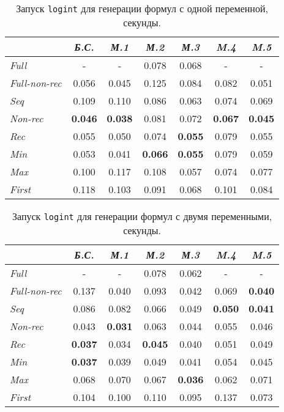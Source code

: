 \begin{table}[h!]
\center
\begin{tabular}{|l|c|c|c|c|c|c|}
\hline
   &{\it Б.С.}&{\it М.1}&{\it М.2}&{\it М.3}&{\it M.4}&{\it M.5} \\ \hline
{\it Full        }&    -         &     -        & 0.078       & 0.068       &    -        &  -  \\ \hline
{\it Full-non-rec}& 0.056        &  0.045       & 0.125       & 0.084       & 0.082       & 0.051\\ \hline
{\it Seq         }& 0.109        &  0.110       & 0.086       & 0.063       & 0.074       & 0.069 \\ \hline
{\it Non-rec     }& {\bf 0.046}  &  {\bf 0.038} & 0.081       & 0.072       & {\bf 0.067} & {\bf 0.045} \\ \hline
{\it Rec         }& 0.055        &  0.050       & 0.074       & {\bf 0.055} & 0.079       & 0.055\\ \hline
{\it Min         }& 0.053        &  0.041       & {\bf 0.066} & {\bf 0.055} & 0.079       & 0.059\\ \hline
{\it Max         }& 0.100        &  0.117       & 0.108       & 0.057       & 0.074       & 0.077\\ \hline
{\it First       }& 0.118        &  0.103       & 0.091       & 0.068       & 0.101       & 0.084\\ \hline
\end{tabular}
\caption{Запуск \lstinline{logint} для генерации формул с одной переменной, секунды.}
\label{fig:logintTest2}
\end{table}

\begin{table}[h!]
\center
\begin{tabular}{|l|c|c|c|c|c|c|}
\hline
   &{\it Б.С.}&{\it М.1}&{\it М.2}&{\it М.3}&{\it M.4}&{\it M.5} \\ \hline
{\it Full        }&    -        &    -        & 0.078       & 0.062      &    -        & - \\ \hline
{\it Full-non-rec}& 0.137       & 0.040       & 0.093       & 0.042      & 0.069       & {\bf 0.040} \\ \hline
{\it Seq         }& 0.086       & 0.082       & 0.066       & 0.049      & {\bf 0.050} & {\bf 0.041} \\ \hline
{\it Non-rec     }& 0.043       & {\bf 0.031} & 0.063       & 0.044      & 0.055       & 0.046 \\ \hline
{\it Rec         }& {\bf 0.037} & 0.034       & {\bf 0.045} & 0.040      & 0.051       & 0.049 \\ \hline
{\it Min         }& {\bf 0.037} & 0.039       & 0.049       & 0.041      & 0.054       & 0.045 \\ \hline
{\it Max         }& 0.068       & 0.070       & 0.067       &{\bf 0.036} & 0.062       & 0.071 \\ \hline
{\it First       }& 0.104       & 0.100       & 0.110       & 0.095      & 0.137       & 0.073 \\ \hline
\end{tabular}
\caption{Запуск \lstinline{logint} для генерации формул с двумя переменными, секунды.}
\label{fig:logintTest3}
\end{table}

